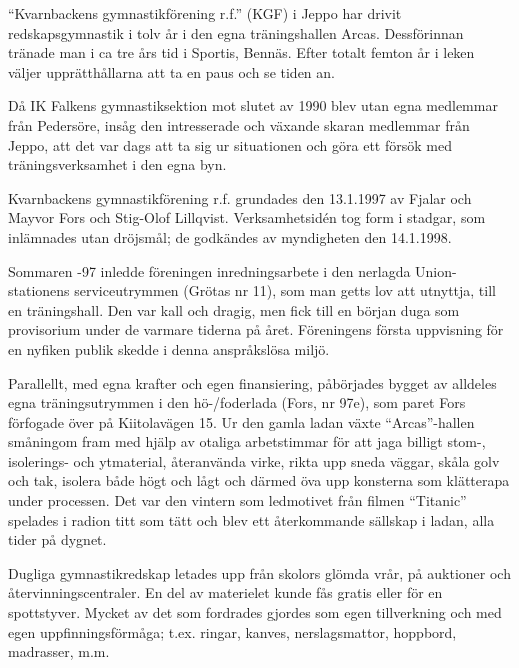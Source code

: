 
``Kvarnbackens gymnastikförening r.f.'' (KGF) i Jeppo har drivit redskapsgymnastik i tolv år i den egna träningshallen Arcas. Dessförinnan tränade man i ca tre års tid i Sportis, Bennäs. Efter totalt femton år i leken väljer upprätthållarna att ta en paus och se tiden an.

Då IK Falkens gymnastiksektion mot slutet av 1990 blev utan egna medlemmar från Pedersöre, insåg den intresserade och växande skaran medlemmar från Jeppo, att det var dags att ta sig ur situationen och göra ett försök med träningsverksamhet i den egna byn.

Kvarnbackens gymnastikförening r.f. grundades den 13.1.1997 av Fjalar och Mayvor Fors och Stig-Olof Lillqvist. Verksamhetsidén tog form i stadgar, som inlämnades utan dröjsmål; de godkändes av myndigheten den 14.1.1998.


Sommaren -97 inledde föreningen inredningsarbete i den nerlagda Union-stationens serviceutrymmen (Grötas nr 11), som man getts lov att utnyttja, till en träningshall. Den var kall och dragig, men fick till en början duga som provisorium under de varmare tiderna på året. Föreningens första uppvisning för en nyfiken publik skedde i denna anspråkslösa miljö.

Parallellt, med egna krafter och egen finansiering, påbörjades bygget av alldeles egna träningsutrymmen i den hö-/foderlada (Fors, nr 97e), som paret Fors förfogade över på Kiitolavägen 15. Ur den gamla ladan växte ``Arcas''-hallen småningom fram med hjälp av otaliga arbetstimmar för att jaga billigt stom-, isolerings- och ytmaterial, återanvända virke, rikta upp sneda väggar, skåla golv och tak, isolera både högt och lågt och därmed öva upp konsterna som klätterapa under processen. Det var den vintern som ledmotivet från filmen ``Titanic'' spelades i radion titt som tätt och blev ett återkommande sällskap i ladan, alla tider på dygnet.


Dugliga gymnastikredskap letades upp från skolors glömda vrår, på auktioner och återvinningscentraler. En del av materielet kunde fås gratis eller för en spottstyver. Mycket av det som fordrades gjordes som egen tillverkning och med egen uppfinningsförmåga; t.ex. ringar, kanves, nerslagsmattor, hoppbord, madrasser, m.m.

